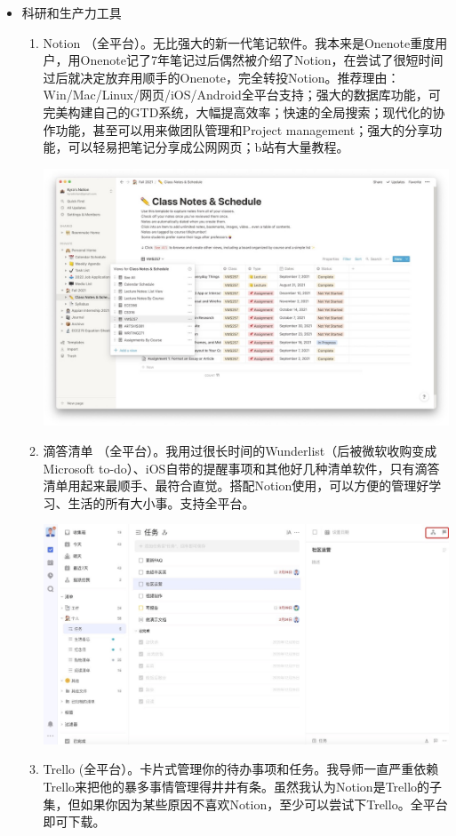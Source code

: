 \begin{itemize}
    \item 科研和生产力工具
    \begin{enumerate}
        \item Notion （全平台）。无比强大的新一代笔记软件。我本来是Onenote重度用户，用Onenote记了7年笔记过后偶然被介绍了Notion，在尝试了很短时间过后就决定放弃用顺手的Onenote，完全转投Notion。推荐理由：Win/Mac/Linux/网页/iOS/Android全平台支持；强大的数据库功能，可完美构建自己的GTD系统，大幅提高效率；快速的全局搜索；现代化的协作功能，甚至可以用来做团队管理和Project management；强大的分享功能，可以轻易把笔记分享成公网网页；b站有大量教程。

            \includegraphics[width=0.8\columnwidth]{author-folder/Kai.Wu/notion.jpg}
        \item 滴答清单 （全平台）。我用过很长时间的Wunderlist（后被微软收购变成Microsoft to-do）、iOS自带的提醒事项和其他好几种清单软件，只有滴答清单用起来最顺手、最符合直觉。搭配Notion使用，可以方便的管理好学习、生活的所有大小事。支持全平台。

        \includegraphics[width=0.8\columnwidth]{author-folder/Kai.Wu/dida.jpg}
        \item Trello (全平台）。卡片式管理你的待办事项和任务。我导师一直严重依赖Trello来把他的暴多事情管理得井井有条。虽然我认为Notion是Trello的子集，但如果你因为某些原因不喜欢Notion，至少可以尝试下Trello。全平台即可下载。


\end{enumerate}
\end{itemize}
